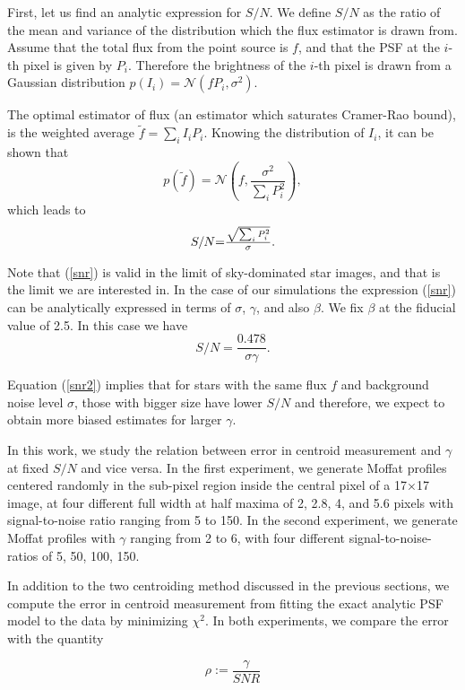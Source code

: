 \documentclass[12pt, preprint]{aastex}
\newcommand{\beq}{\begin{equation}}
\newcommand{\eeq}{\end{equation}}
\begin{document}
First, let us find an analytic expression for $S/N$. We define $S/N$ as the ratio of the mean and variance of the distribution which the flux estimator is drawn from. Assume that the total flux from the point source is $f$, and that the PSF at the $i$-th pixel is given by $P_{i}$. Therefore the brightness of the $i$-th pixel is drawn from a Gaussian distribution $p(I_{i}) = \mathcal{N}(fP_{i},\sigma^{2})$. 

The optimal estimator of flux (an estimator which saturates Cramer-Rao bound), is the weighted average $\tilde{f}=\sum_{i}I_{i}P_{i}$. Knowing the distribution of $I_{i}$, it can be shown that 
\beq
p(\tilde{f}) = \mathcal{N}(f , \frac{\sigma^{2}}{\sum_{i}P_{i}^{2}}),
\eeq  
which leads to
\beq
\begin{array}{l}
S/N $=$ \frac{\sqrt{\sum_{i} P_{i}^{2}}}{\sigma}.
\end{array}
\label{snr}
\eeq

Note that (\ref{snr}) is valid in the limit of sky-dominated star images, and that is the limit we are interested in. In the case of our simulations the expression (\ref{snr}) can be analytically expressed in terms of $\sigma$, $\gamma$, and also $\beta$. We fix $\beta$ at the fiducial value of 2.5. In this case we have
\beq
S/N = \frac{0.478}{\sigma \gamma}.
\label{snr2}
\eeq

Equation (\ref{snr2}) implies that for stars with the same flux $f$ and background noise level $\sigma$, those with bigger size have lower $S/N$ and therefore, we expect to obtain more biased estimates for larger $\gamma$. 

In this work, we study the relation between error in centroid measurement and $\gamma$ at fixed $S/N$ and vice versa. In the first experiment, we generate Moffat profiles centered randomly in the sub-pixel region inside the central pixel of a 17$\times$17 image, at four different full width at half maxima of 2, 2.8, 4, and 5.6 pixels with signal-to-noise ratio ranging from 5 to 150. In the second experiment, we generate Moffat profiles with $\gamma$ ranging from 2 to 6, with four different signal-to-noise-ratios of 5, 50, 100, 150.

In addition to the two centroiding method discussed in the previous sections, we compute the error in centroid measurement from fitting the exact analytic PSF model to the data by minimizing $\chi^{2}$. In both experiments, we compare the error with the quantity

\beq
\rho := \frac{\gamma}{SNR}
\eeq
\end{document}
